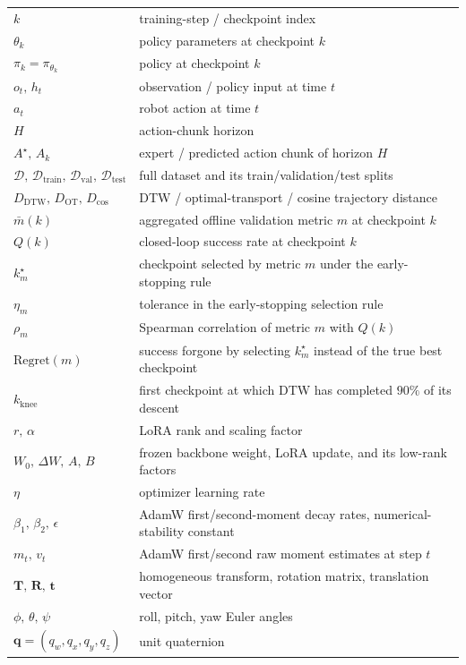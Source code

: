 \documentclass[english,12pt,a4paper,pdftex,elec,utf8]{aaltothesis}
\begin{document}
\begin{tabular}{ll}
$k$                              & training-step / checkpoint index \\
$\theta_k$                       & policy parameters at checkpoint $k$ \\
$\pi_k = \pi_{\theta_k}$         & policy at checkpoint $k$ \\
$o_t,\,h_t$                      & observation / policy input at time $t$ \\
$a_t$                            & robot action at time $t$ \\
$H$                              & action-chunk horizon \\
$A^\star,\,A_k$                  & expert / predicted action chunk of horizon $H$ \\
$\mathcal{D},\,\mathcal{D}_{\mathrm{train}},\,\mathcal{D}_{\mathrm{val}},\,\mathcal{D}_{\mathrm{test}}$ & full dataset and its train/validation/test splits \\
$D_{\mathrm{DTW}},\,D_{\mathrm{OT}},\,D_{\cos}$ & DTW / optimal-transport / cosine trajectory distance \\
$\bar m(k)$                      & aggregated offline validation metric $m$ at checkpoint $k$ \\
$Q(k)$                           & closed-loop success rate at checkpoint $k$ \\
$k_m^\star$                      & checkpoint selected by metric $m$ under the early-stopping rule \\
$\eta_m$                         & tolerance in the early-stopping selection rule \\
$\rho_m$                         & Spearman correlation of metric $m$ with $Q(k)$ \\
$\mathrm{Regret}(m)$             & success forgone by selecting $k_m^\star$ instead of the true best checkpoint \\
$k_{\mathrm{knee}}$              & first checkpoint at which DTW has completed $90\%$ of its descent \\
$r,\,\alpha$                     & LoRA rank and scaling factor \\
$W_0,\,\Delta W,\,A,\,B$         & frozen backbone weight, LoRA update, and its low-rank factors \\
$\eta$                           & optimizer learning rate \\
$\beta_1,\,\beta_2,\,\epsilon$   & AdamW first/second-moment decay rates, numerical-stability constant \\
$m_t,\,v_t$                      & AdamW first/second raw moment estimates at step $t$ \\
$\mathbf{T},\,\mathbf{R},\,\mathbf{t}$ & homogeneous transform, rotation matrix, translation vector \\
$\phi,\,\theta,\,\psi$           & roll, pitch, yaw Euler angles \\
$\mathbf{q}=(q_w,q_x,q_y,q_z)$   & unit quaternion
\end{tabular}
\end{document}
